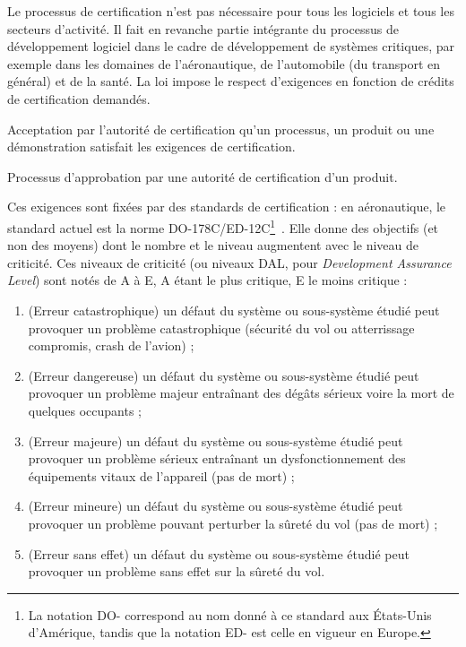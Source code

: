 Le processus de certification n'est pas nécessaire pour tous les logiciels et
tous les secteurs d'activité. Il fait en revanche partie intégrante du
processus de développement logiciel dans le cadre de développement de systèmes
critiques, par exemple dans les domaines de l'aéronautique, de l'automobile (du
transport en général) et de la santé. La loi impose le respect d'exigences en
fonction de crédits de certification demandés. 

\begin{definition}
  Acceptation par l'autorité de certification qu'un processus, un produit ou
  une démonstration satisfait les exigences de certification.
\end{definition}

\begin{definition}[Certification]
  Processus d'approbation par une autorité de certification d'un produit.
\end{definition}


Ces exigences sont fixées par des standards de certification : en aéronautique,
le standard actuel est la norme DO-178C/ED-12C\footnote{La notation DO-
correspond au nom donné à ce standard aux États-Unis d'Amérique, tandis que la
notation ED- est celle en vigueur en Europe.}~\cite{DO-178C}. Elle donne des
objectifs (et non des moyens) dont le nombre et le niveau augmentent avec le
niveau de criticité. Ces niveaux de criticité (ou niveaux DAL, pour
\emph{Development Assurance Level}) sont notés de A à E, A étant le plus
critique, E le moins critique : 

\begin{enumerate}

  \item (Erreur catastrophique) un défaut du système ou sous-système étudié
    peut provoquer un problème catastrophique (sécurité du vol ou atterrissage
    compromis, crash de l'avion) ;

  \item (Erreur dangereuse) un défaut du système ou sous-système étudié peut
    provoquer un problème majeur entraînant des dégâts sérieux voire la mort de
    quelques occupants ;

  \item (Erreur majeure) un défaut du système ou sous-système étudié peut
    provoquer un problème sérieux entraînant un dysfonctionnement des
    équipements vitaux de l'appareil (pas de mort) ;

  \item (Erreur mineure) un défaut du système ou sous-système étudié peut
    provoquer un problème pouvant perturber la sûreté du vol (pas de mort) ;

  \item (Erreur sans effet) un défaut du système ou sous-système étudié peut
    provoquer un problème sans effet sur la sûreté du vol.

\end{enumerate}


